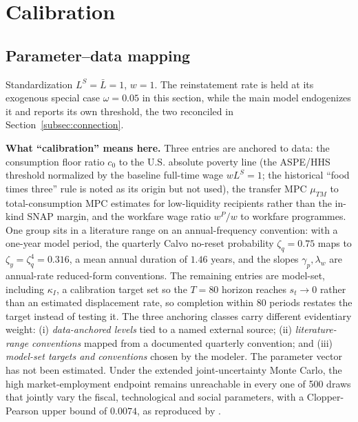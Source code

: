 \documentclass[review,12pt]{elsarticle}
\theoremstyle{plain}
\theoremstyle{definition}
\theoremstyle{remark}
\newcommand{\barL}{\bar{L}}
\begin{document}
\section{Calibration}
\label{sec:calibration}
\subsection{Parameter--data mapping}
Standardization $L^S=\barL=1$, $w=1$. The reinstatement rate is held at its exogenous special case $\omega=0.05$ in this section, while the main model endogenizes it and reports its own threshold, the two reconciled in Section~\ref{subsec:connection}.

\smallskip\noindent\textbf{What ``calibration'' means here.} Three entries are anchored to data: the consumption floor ratio $c_0$ to the U.S. absolute poverty line (the ASPE/HHS threshold normalized by the baseline full-time wage $wL^S=1$; the historical ``food times three'' rule is noted as its origin but not used), the transfer MPC $\mu_{TM}$ to total-consumption MPC estimates for low-liquidity recipients rather than the in-kind SNAP margin, and the workfare wage ratio $w^P/w$ to workfare programmes. One group sits in a literature range on an annual-frequency convention: with a one-year model period, the quarterly Calvo no-reset probability $\zeta_q=0.75$ maps to $\zeta_y=\zeta_q^4=0.316$, a mean annual duration of $1.46$ years, and the slopes $\gamma_p,\lambda_w$ are annual-rate reduced-form conventions. The remaining entries are model-set, including $\kappa_I$, a calibration target set so the $T=80$ horizon reaches $s_t\to0$ rather than an estimated displacement rate, so completion within 80 periods restates the target instead of testing it. The three anchoring classes carry different evidentiary weight: (i) \emph{data-anchored levels} tied to a named external source; (ii) \emph{literature-range conventions} mapped from a documented quarterly convention; and (iii) \emph{model-set targets and conventions} chosen by the modeler. The parameter vector has not been estimated. Under the extended joint-uncertainty Monte Carlo, the high market-employment endpoint remains unreachable in every one of 500 draws that jointly vary the fiscal, technological and social parameters, with a Clopper-Pearson upper bound of $0.0074$, as reproduced by .
\end{document}
